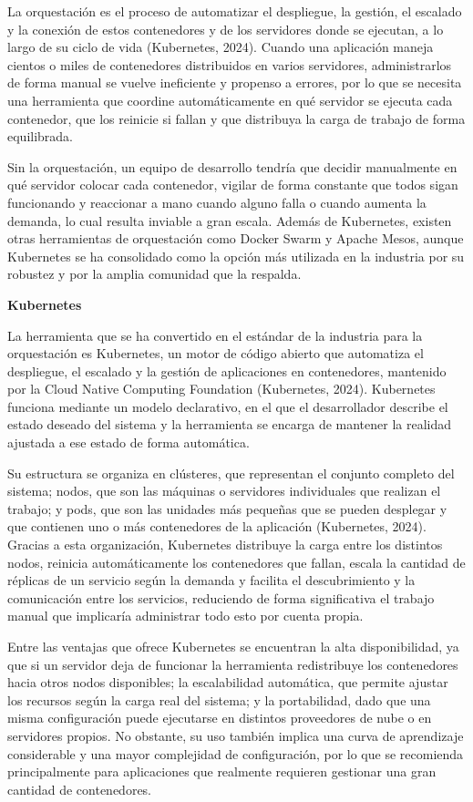 \documentclass[12pt,letterpaper]{article}
\newcommand{\subtitulo}[1]{\vspace{12pt}\noindent\textbf{#1}\par\vspace{10pt}}
\begin{document}
La orquestación es el proceso de automatizar el despliegue, la gestión, el escalado y la conexión de estos contenedores y de los servidores donde se ejecutan, a lo largo de su ciclo de vida (Kubernetes, 2024). Cuando una aplicación maneja cientos o miles de contenedores distribuidos en varios servidores, administrarlos de forma manual se vuelve ineficiente y propenso a errores, por lo que se necesita una herramienta que coordine automáticamente en qué servidor se ejecuta cada contenedor, que los reinicie si fallan y que distribuya la carga de trabajo de forma equilibrada.

Sin la orquestación, un equipo de desarrollo tendría que decidir manualmente en qué servidor colocar cada contenedor, vigilar de forma constante que todos sigan funcionando y reaccionar a mano cuando alguno falla o cuando aumenta la demanda, lo cual resulta inviable a gran escala. Además de Kubernetes, existen otras herramientas de orquestación como Docker Swarm y Apache Mesos, aunque Kubernetes se ha consolidado como la opción más utilizada en la industria por su robustez y por la amplia comunidad que la respalda.

\subtitulo{Kubernetes}
La herramienta que se ha convertido en el estándar de la industria para la orquestación es Kubernetes, un motor de código abierto que automatiza el despliegue, el escalado y la gestión de aplicaciones en contenedores, mantenido por la Cloud Native Computing Foundation (Kubernetes, 2024). Kubernetes funciona mediante un modelo declarativo, en el que el desarrollador describe el estado deseado del sistema y la herramienta se encarga de mantener la realidad ajustada a ese estado de forma automática.

Su estructura se organiza en clústeres, que representan el conjunto completo del sistema; nodos, que son las máquinas o servidores individuales que realizan el trabajo; y pods, que son las unidades más pequeñas que se pueden desplegar y que contienen uno o más contenedores de la aplicación (Kubernetes, 2024). Gracias a esta organización, Kubernetes distribuye la carga entre los distintos nodos, reinicia automáticamente los contenedores que fallan, escala la cantidad de réplicas de un servicio según la demanda y facilita el descubrimiento y la comunicación entre los servicios, reduciendo de forma significativa el trabajo manual que implicaría administrar todo esto por cuenta propia.

Entre las ventajas que ofrece Kubernetes se encuentran la alta disponibilidad, ya que si un servidor deja de funcionar la herramienta redistribuye los contenedores hacia otros nodos disponibles; la escalabilidad automática, que permite ajustar los recursos según la carga real del sistema; y la portabilidad, dado que una misma configuración puede ejecutarse en distintos proveedores de nube o en servidores propios. No obstante, su uso también implica una curva de aprendizaje considerable y una mayor complejidad de configuración, por lo que se recomienda principalmente para aplicaciones que realmente requieren gestionar una gran cantidad de contenedores.
\end{document}
